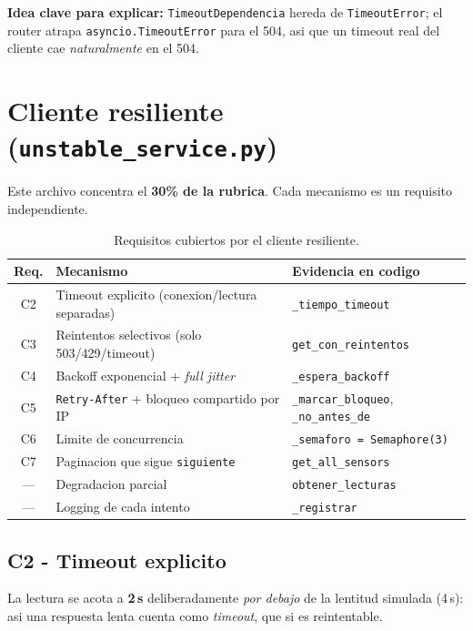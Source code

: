 \documentclass[11pt,a4paper]{article}
\newcommand{\arch}[1]{\texttt{#1}}
\begin{document}
\textbf{Idea clave para explicar:} \arch{TimeoutDependencia} hereda de
\arch{TimeoutError}; el router atrapa \arch{asyncio.TimeoutError} para el 504,
asi que un timeout real del cliente cae \emph{naturalmente} en el 504.

\section{Cliente resiliente (\arch{unstable\_service.py})}

Este archivo concentra el \textbf{30\% de la rubrica}. Cada mecanismo es un
requisito independiente.

\begin{table}[H]
\centering
\begin{tabular}{c p{6.2cm} p{5.6cm}}
\toprule
\textbf{Req.} & \textbf{Mecanismo} & \textbf{Evidencia en codigo} \\
\midrule
C2 & Timeout explicito (conexion/lectura separadas) & \arch{\_tiempo\_timeout} \\
C3 & Reintentos selectivos (solo 503/429/timeout) & \arch{get\_con\_reintentos} \\
C4 & Backoff exponencial + \emph{full jitter} & \arch{\_espera\_backoff} \\
C5 & \arch{Retry-After} + bloqueo compartido por IP & \arch{\_marcar\_bloqueo}, \arch{\_no\_antes\_de} \\
C6 & Limite de concurrencia & \arch{\_semaforo = Semaphore(3)} \\
C7 & Paginacion que sigue \arch{siguiente} & \arch{get\_all\_sensors} \\
--- & Degradacion parcial & \arch{obtener\_lecturas} \\
--- & Logging de cada intento & \arch{\_registrar} \\
\bottomrule
\end{tabular}
\caption{Requisitos cubiertos por el cliente resiliente.}
\end{table}

\subsection{C2 - Timeout explicito}
La lectura se acota a \textbf{2\,s} deliberadamente \emph{por debajo} de la
lentitud simulada (4\,s): asi una respuesta lenta cuenta como \emph{timeout},
que si es reintentable.
\end{document}
